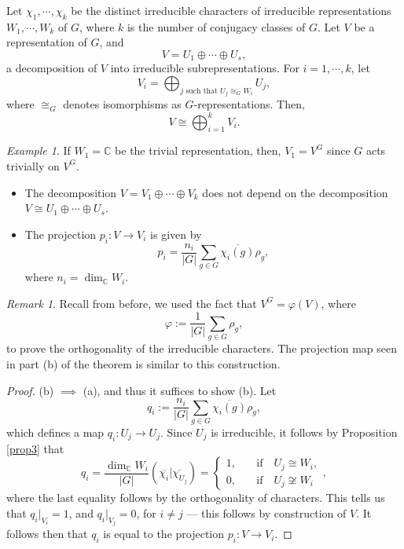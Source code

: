\documentclass[a4paper]{report}
\theoremstyle{definition}
\theoremstyle{remark}
\newtheorem{remark}{Remark}
\theoremstyle{proposition}
\theoremstyle{conjecture}
\theoremstyle{lemma}
\theoremstyle{corollary}
\theoremstyle{exercise}
\theoremstyle{example}
\newtheorem{example}{Example}
\newcommand{\C}{\mathbb{C}}
\begin{document}
Let $\chi_1,\cdots,\chi_k$ be the distinct irreducible characters 
of irreducible representations $W_1,\cdots,W_k$ of $G$, where $k$ 
is the number of conjugacy classes of $G$. Let $V$ be a representation of $G$, 
and $$V = U_1\oplus\cdots\oplus U_s,$$ a decomposition of $V$ into irreducible 
subrepresentations. For $i = 1,\cdots,k$, let 
$$V_i = \bigoplus_{\text{$j$ such that $U_j\cong_G W_i$}} U_j,$$
where $\cong_G$ denotes isomorphisms as $G$-representations. 
Then, $$V \cong \bigoplus_{i=1}^k V_i.$$

\begin{example}
    If $W_1 = \C$ be the trivial representation, then, $V_1 = V^G$ since 
    $G$ acts trivially on $V^G$. 
\end{example}

\begin{theorem}
    \leavevmode
    \begin{itemize}
        \item[(a)] The decomposition $V = V_1\oplus\cdots\oplus V_k$ 
            does not depend on the decomposition 
            $V \cong U_1\oplus\cdots\oplus U_s$. 
        \item[(b)] The projection $p_i : V \to V_i$ is given by
            $$p_i = \frac{n_i}{\vert G \vert} \sum_{g \in G}\overline{\chi_i(g)}\rho_g,$$
            where $n_i = \dim_\C W_i$.
    \end{itemize}
\end{theorem}

\begin{remark}
    Recall from before, we used the fact that $V^G = \varphi(V)$, where 
    $$\varphi := \frac{1}{\vert G \vert}\sum_{g \in G} \rho_g,$$
    to prove the orthogonality of the irreducible characters. The projection map
    seen in part (b) of the theorem is similar to this construction.
\end{remark}

\begin{proof} 
    (b) $\implies$ (a), and thus it suffices to show (b). Let 
    $$q_i := \frac{n_i}{\vert G \vert} \sum_{g \in G} \overline{\chi_i(g)}\rho_g,$$
    which defines a map $q_i : U_j \to U_j$. Since $U_j$ is irreducible, it 
    follows by Proposition \ref{prop3} that 
    $$q_i = \frac{\dim_\C W_i}{\vert G \vert} (\overline{\chi_i} \vert \overline{\chi_{U_j}}) = \begin{cases}
        1,\quad &\text{if} \quad U_j \cong W_i,\\
        0, \quad &\text{if} \quad U_j\not\cong W_i
    \end{cases},$$
    where the last equality follows by the orthogonality of characters.
    This tells us that $q_i\vert_{V_i} = 1$, and $q_i\vert_{V_j} = 0$, for 
    $i\neq j$ --- this follows by construction of $V$.
    It follows then that $q_i$ is equal to the projection $p_i : V\to V_i$.
\end{proof}
\end{document}
